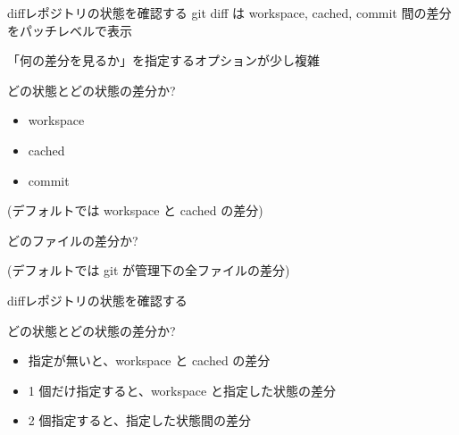 
\begin{frame}[t]{diff}{レポジトリの状態を確認する}
  git diff は workspace, cached, commit 間の差分をパッチレベルで表示
  \vspace{4ex}

  「何の差分を見るか」を指定するオプションが少し複雑
  \vspace{4ex}

  どの状態とどの状態の差分か?
  \begin{itemize}
  \item workspace
  \item cached
  \item commit
  \end{itemize}
  (デフォルトでは workspace と cached の差分)

  \vspace{2ex}

  どのファイルの差分か?

  (デフォルトでは git が管理下の全ファイルの差分)
\end{frame}


\begin{frame}[t]{diff}{レポジトリの状態を確認する}

  どの状態とどの状態の差分か?
  \vspace{4ex}

  \begin{itemize}
  \item 指定が無いと、workspace と cached の差分
  \item 1 個だけ指定すると、workspace と指定した状態の差分
  \item 2 個指定すると、指定した状態間の差分
  \end{itemize}
\end{frame}


